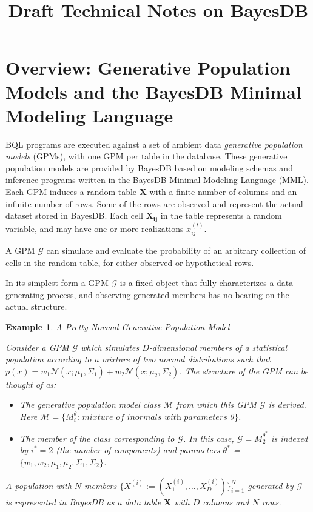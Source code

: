 \documentclass[10pt,letterpaper]{article}
\title{Draft Technical Notes on BayesDB}
\newtheorem{example}{Example}[section]
\newcommand{\set}[1]{\{#1\}}
\begin{document}
\maketitle
\section{Overview: Generative Population Models and the BayesDB Minimal Modeling Language}
\label{sec:overview}

BQL programs are executed against a set of ambient data \textit{generative population models} (GPMs), with one
GPM per table in the database. These generative population models are provided by BayesDB based on modeling schemas and inference
programs written in the BayesDB Minimal Modeling Language (MML). Each GPM
induces a random table $\mathbf{X}$ with a finite  number of columns and an
infinite number of rows. Some of the rows are observed and represent the actual
dataset stored in BayesDB. Each cell $\mathbf{X_{ij}}$ in the table represents a
random variable, and may have one or more realizations $x_{ij}^{(t)}$.

A GPM $\mathcal{G}$ can simulate and evaluate the probability of an
arbitrary collection of cells in the random table, for either observed or hypothetical rows.

In its simplest form a GPM $\mathcal{G}$ is a fixed object that fully
characterizes a data generating process, and observing generated members has no
bearing on the actual structure.

\begin{example} \label{ex:normal_gpm} A Pretty Normal Generative Population Model

Consider a GPM $\mathcal{G}$ which simulates $D$-dimensional members of a
statistical population according to a mixture of two normal distributions such
that $p(x)= w_1\mathcal{N}(x;\mu_1,\Sigma_1) +
w_2\mathcal{N}(x;\mu_2,\Sigma_2)$. The \textit{structure} of the
GPM can be thought of as:
\begin{itemize}
\item The generative population model class $\mathcal{M}$ from which this GPM $\mathcal{G}$ is
 derived. Here $\mathcal{M} = \set{M_i^\theta \textit{: mixture of } i \textit{
 normals with parameters } \theta}$.

\item  The member of the class corresponding to $\mathcal{G}$. In this case, $\mathcal{G}=M_2^{\theta^*}$ is indexed by $i^*=2$ (the number of
components) and parameters $\theta^*$ = $\set{w_1,w_2,\mu_1,\mu_2,\Sigma_1,\Sigma_2}$.
\end{itemize}

A population with $N$ members $\{X^{(i)} := (X_1^{(i)},\dots,X_D^{(i)})
\}_{i=1}^N$ generated by $\mathcal{G}$ is represented in BayesDB as a data table
$\mathbf{X}$ with $D$ columns and $N$ rows.
\end{example}
\end{document}
